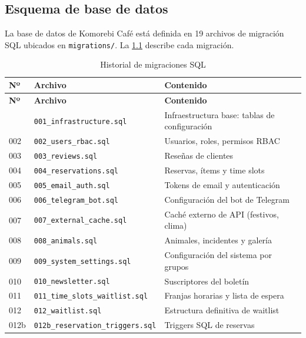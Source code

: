 \documentclass[12pt,a4paper,twoside,openright]{report}
\begin{document}
\begin{appendices}
\chapter{Esquema de base de datos}
\label{ap:bd}

La base de datos de Komorebi Café está definida en 19 archivos de migración SQL
ubicados en \texttt{migrations/}. La \cref{tab:migraciones} describe cada migración.

\begin{longtable}{@{}llp{7cm}@{}}
  \caption{Historial de migraciones SQL}
  \label{tab:migraciones}\\
  \toprule
  \textbf{Nº} & \textbf{Archivo} & \textbf{Contenido}\\
  \midrule
  \endfirsthead
  \toprule
  \textbf{Nº} & \textbf{Archivo} & \textbf{Contenido}\\
  \midrule
  \endhead
  \bottomrule
  \endfoot
  001 & \texttt{001\_infrastructure.sql}       & Infraestructura base: tablas de configuración\\
  002 & \texttt{002\_users\_rbac.sql}           & Usuarios, roles, permisos RBAC\\
  003 & \texttt{003\_reviews.sql}               & Reseñas de clientes\\
  004 & \texttt{004\_reservations.sql}          & Reservas, ítems y time slots\\
  005 & \texttt{005\_email\_auth.sql}           & Tokens de email y autenticación\\
  006 & \texttt{006\_telegram\_bot.sql}         & Configuración del bot de Telegram\\
  007 & \texttt{007\_external\_cache.sql}       & Caché externo de API (festivos, clima)\\
  008 & \texttt{008\_animals.sql}               & Animales, incidentes y galería\\
  009 & \texttt{009\_system\_settings.sql}      & Configuración del sistema por grupos\\
  010 & \texttt{010\_newsletter.sql}            & Suscriptores del boletín\\
  011 & \texttt{011\_time\_slots\_waitlist.sql} & Franjas horarias y lista de espera\\
  012 & \texttt{012\_waitlist.sql}              & Estructura definitiva de waitlist\\
  012b& \texttt{012b\_reservation\_triggers.sql}& Triggers SQL de reservas\\

\end{longtable}
\end{appendices}
\end{document}
